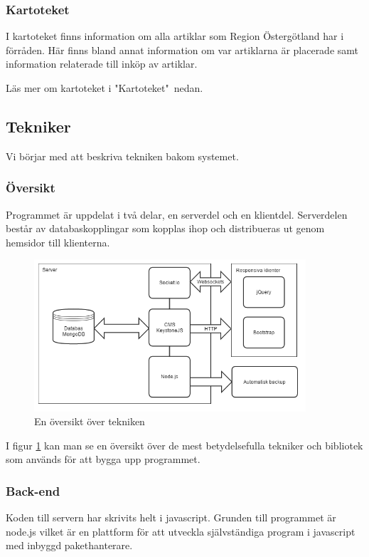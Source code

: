 \subsubsection{Kartoteket}
I kartoteket finns information om alla artiklar som Region Östergötland har i förråden.
Här finns bland annat information om var artiklarna är placerade samt information relaterade till inköp av artiklar.

Läs mer om kartoteket i "Kartoteket"\ nedan.

\subsection{Tekniker}
Vi börjar med att beskriva tekniken bakom systemet.

\subsubsection{Översikt}
Programmet är uppdelat i två delar, en serverdel och en klientdel.
Serverdelen består av databaskopplingar som kopplas ihop och distribueras ut genom hemsidor till klienterna.

\begin{figure}
  \centering
  \includegraphics[width=0.9\textwidth]{images/techoverview.png}
  \caption{En översikt över tekniken}
  \label{fig:techoverview}
\end{figure}

I figur \ref{fig:techoverview} kan man se en översikt över de mest betydelsefulla tekniker och bibliotek som används för att bygga upp programmet.

\subsubsection{Back-end}
Koden till servern har skrivits helt i javascript.
Grunden till programmet är node.js vilket är en plattform för att utveckla självständiga program i javascript med inbyggd pakethanterare.

